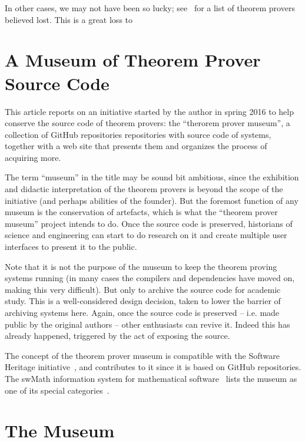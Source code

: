 \documentclass[smallcondensed]{svjour3}
\begin{document}
In other cases, we may not have been so lucky; see~\cite{tpmuseum:tpbl:on} for a list of
theorem provers believed lost. This is a great loss to

\section{A Museum of Theorem Prover Source Code}

This article reports on an initiative started by the author in spring 2016 to help
conserve the source code of theorem provers: the ``therorem prover museum'', a collection
of GitHub repositories repositories with source code of systems, together with a web site
that presents them and organizes the process of acquiring more.

The term ``museum'' in the title may be sound bit ambitious, since the exhibition and
didactic interpretation of the theorem provers is beyond the scope of the initiative (and
perhaps abilities of the founder). But the foremost function of any museum is the
conservation of artefacts, which is what the ``theorem prover museum'' project intends to
do. Once the source code is preserved, historians of science and engineering can start to
do research on it and create multiple user interfaces to present it to the public. 

Note that it is not the purpose of the museum to keep the theorem proving systems running
(in many cases the compilers and dependencies have moved on, making this very
difficult). But only to archive the source code for academic study.  This is a
well-considered design decision, taken to lower the barrier of archiving systems
here. Again, once the source code is preserved -- i.e. made public by the original authors
-- other enthusiasts can revive it. Indeed this has already happened, triggered by the act
of exposing the source.

The concept of the theorem prover museum is compatible with the Software Heritage
initiative~\cite{SoftwareHeritage:on}, and contributes to it since it is based on GitHub
repositories. The \textsf{swMath} information system for mathematical
software~\cite{swMath:on} lists the museum as one of its special
categories~\cite{swMath:tpmuseum:on}.


\section{The Museum}
\end{document}
